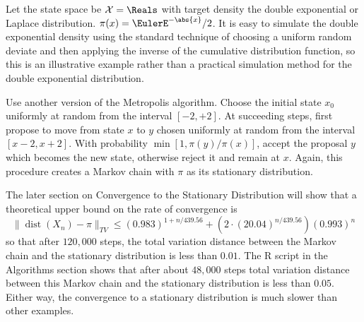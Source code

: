 \documentclass[12pt]{article}
\begin{document}
Let the state space be \( \mathcal{X} = \Reals \) with target density
the double exponential or Laplace distribution. \( \pi(x) = \EulerE^{-\abs
{x}}/2 \).  It is easy to simulate the double exponential density using
the standard technique of choosing a uniform random deviate and then
applying the inverse of the cumulative distribution function, so this is
an illustrative example rather than a practical simulation method for
the double exponential distribution.

Use another version of the Metropolis algorithm.  Choose the initial
state \( x_0 \) uniformly at random from the interval \( [ -2, +2] \).
At succeeding steps, first propose to move from state \( x \) to \( y \)
chosen uniformly at random from the interval \( [x - 2, x + 2] \).  With
probability \( \min[1, \pi(y)/\pi(x)] \), accept the proposal \( y \)
which becomes the new state, otherwise reject it and remain at \( x \).
Again, this procedure creates a Markov chain with \( \pi \) as its
stationary distribution.

The later section on Convergence to the Stationary Distribution will
show that a theoretical upper bound on the rate of convergence is
\[
    \|
    \operatorname{dist}
    (X_n) - \pi \|_{TV} \le (0.983)^{1 + n/439.56} + (2 \cdot (20.04)^{n/439.56})
    (0.993)^n
\] so that after \( 120{,}000 \) steps, the total variation distance
between the Markov chain and the stationary distribution is less than \(
0.01 \).  The R script in the Algorithms section shows that after about \(
48{,}000 \) steps total variation distance between this Markov chain and
the stationary distribution is less than \( 0.05 \).  Either way, the
convergence to a stationary distribution is much slower than other
examples.


\end{document}
